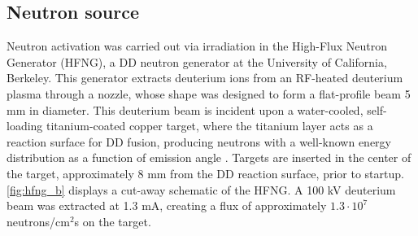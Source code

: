 \documentclass[5p]{elsarticle}
\newcommand{\sci}[2]{ #1 \cdot 10^{#2}\ }
\newcommand{\comment}[1]{\todo[color=blue!20!white,inline]{ASV: #1}}
\begin{document}
\subsection{Neutron source}\label{sec:n_source}



Neutron activation was carried out via irradiation in the High-Flux Neutron Generator (HFNG), a DD neutron generator at the University of California, Berkeley. This generator extracts deuterium ions from an RF-heated deuterium plasma through a nozzle, whose shape was designed to form a flat-profile beam 5 mm in diameter. This deuterium beam is incident upon a water-cooled, self-loading titanium-coated copper target, where the titanium layer acts as a reaction surface for DD fusion, producing neutrons with a well-known energy distribution as a function of  emission angle \cite{Liskien_Paulsen_1973}. Targets are inserted in the center of the target, approximately 8 mm from the DD reaction surface, prior to startup. \autoref{fig:hfng_b} displays a cut-away schematic of the HFNG. A 100 kV deuterium beam was extracted at 1.3 mA, creating a flux of approximately  $\sci{1.3}{7}$ neutrons/cm$^2$s on the target.





\end{document}
